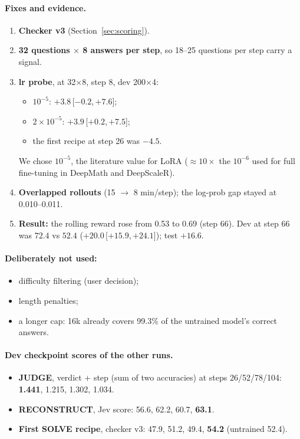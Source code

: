 \documentclass[10pt,a4paper]{article}
\newcommand{\ci}[2]{\,{\scriptsize[#1,\,#2]}}
\begin{document}
\paragraph{Fixes and evidence.}
\begin{enumerate}
\item \textbf{Checker v3} (Section~\ref{sec:scoring}).
\item \textbf{32 questions $\times$ 8 answers per step}, so 18--25 questions per step carry a signal.
\item \textbf{lr probe}, at 32$\times$8, step 8, dev 200$\times$4:
  \begin{itemize}
  \item $10^{-5}$: $+3.8$\ci{$-0.2$}{$+7.6$};
  \item $2\times10^{-5}$: $+3.9$\ci{$+0.2$}{$+7.5$};
  \item the first recipe at step 26 was $-4.5$.
  \end{itemize}
  We chose $10^{-5}$, the literature value for LoRA ($\approx10\times$ the $10^{-6}$ used for full fine-tuning in
  DeepMath and DeepScaleR).
\item \textbf{Overlapped rollouts} (15 $\rightarrow$ 8 min/step); the log-prob gap stayed at 0.010--0.011.
\item \textbf{Result:} the rolling reward rose from 0.53 to 0.69 (step 66). Dev at step 66 was $72.4$ vs $52.4$
      ($+20.0$\ci{$+15.9$}{$+24.1$}); test $+16.6$.
\end{enumerate}

\paragraph{Deliberately not used:}
\begin{itemize}
\item difficulty filtering (user decision);
\item length penalties;
\item a longer cap: 16k already covers 99.3\% of the untrained model's correct answers.
\end{itemize}

\paragraph{Dev checkpoint scores of the other runs.}
\begin{itemize}
\item \textbf{JUDGE}, verdict + step (sum of two accuracies) at steps 26/52/78/104: \textbf{1.441}, 1.215, 1.302,
      1.034.
\item \textbf{RECONSTRUCT}, Jev score: 56.6, 62.2, 60.7, \textbf{63.1}.
\item \textbf{First SOLVE recipe}, checker v3: 47.9, 51.2, 49.4, \textbf{54.2} (untrained 52.4).
\end{itemize}
\end{document}
